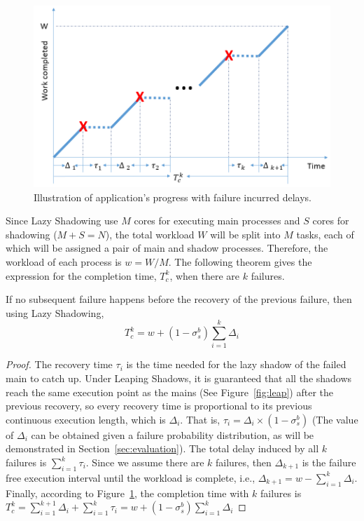\begin{figure}[!t]
	\begin{center}
		\includegraphics[width=\columnwidth]{Figures/progress}
	\end{center}
	\caption{Illustration of application's progress with failure incurred delays.}
	\label{fig:progress}
\end{figure}

Since Lazy Shadowing use $M$ cores for executing main processes and $S$ cores for shadowing ($M+S=N$), the total workload $W$ will be split into $M$ tasks, each of which will be assigned a pair of main and shadow processes. Therefore, the workload of each process is 
$w=W/M$. The following theorem gives the expression for the completion time, $T_c^k$, when there are $k$ failures.

\begin{theorem}
If no subsequent failure happens before the recovery of the previous failure, then using Lazy Shadowing, 
	$$T_c^k = w + (1-\sigma_s^b)\sum_{i=1}^k\Delta_i$$
\end{theorem}
\begin{proof}
The recovery time $\tau_i$ is the time needed for the lazy shadow of the failed main to catch up. Under Leaping Shadows, it is guaranteed that all the shadows reach the same execution point as the mains (See Figure~\ref{fig:leap}) after the previous recovery, so every recovery time is proportional to its previous continuous execution length, which is $\Delta_i$. That is, $\tau_i = \Delta_i \times (1 - \sigma_s^b)$ (The value of $\Delta_i$ can be obtained given a failure probability distribution, as will be demonstrated in Section~\ref{sec:evaluation}). The total delay induced by all $k$ failures is $\sum_{i=1}^k\tau_i$.
Since we assume there are $k$ failures, then $\Delta_{k+1}$ is the failure free execution interval until the workload is complete, i.e., $\Delta_{k+1} = w - \sum_{i=1}^{k}\Delta_i$. Finally, according to Figure~\ref{fig:progress}, the completion time with $k$ failures is 
	$T_c^k = \sum_{i=1}^{k+1}\Delta_i + \sum_{i=1}^k\tau_i = w + (1-\sigma_s^b)\sum_{i=1}^k\Delta_i$
\end{proof}

